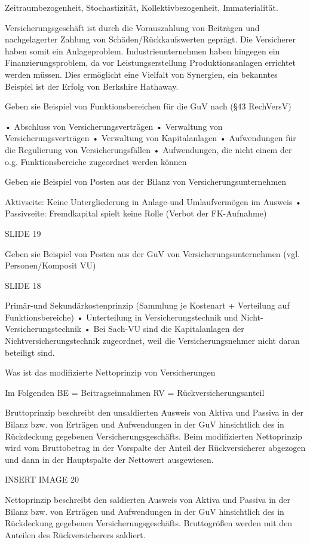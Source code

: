 Zeitraumbezogenheit, Stochastizität, Kollektivbezogenheit, Immaterialität.

Versicherungsgeschäft ist durch die Vorauszahlung von Beiträgen und nachgelagerter Zahlung von Schäden/Rückkaufswerten
geprägt. Die Versicherer haben somit ein Anlageproblem. Industrieunternehmen haben hingegen ein Finanzierungsproblem, da vor
Leistungserstellung Produktionsanlagen errichtet werden müssen. Dies ermöglicht eine Vielfalt von Synergien, ein bekanntes Beispiel
ist der Erfolg von Berkshire Hathaway.

Geben sie Beispiel von Funktionsbereichen für die GuV nach (§43 RechVersV)

• Abschluss von Versicherungsverträgen
• Verwaltung von Versicherungsverträgen
• Verwaltung von Kapitalanlagen
• Aufwendungen für die Regulierung von Versicherungsfällen
• Aufwendungen, die nicht einem der o.g. Funktionsbereiche zugeordnet werden können


Geben sie Beispiel von Posten aus der Bilanz von Versicherungsunternehmen

Aktivseite: Keine Untergliederung in Anlage-und Umlaufvermögen im Ausweis
• Passivseite: Fremdkapital spielt keine Rolle (Verbot der FK-Aufnahme)


SLIDE 19

Geben sie Beispiel von Posten aus der GuV von Versicherungsunternehmen (vgl. Personen/Komposit VU)

SLIDE 18

Primär-und Sekundärkostenprinzip (Sammlung je Kostenart + Verteilung auf Funktionsbereiche)
• Unterteilung in Versicherungstechnik und Nicht-Versicherungstechnik
• Bei Sach-VU sind die Kapitalanlagen der Nichtversicherungstechnik zugeordnet, weil die Versicherungsnehmer nicht daran beteiligt sind.


Was ist das modifizierte Nettoprinzip von Versicherungen

Im Folgenden
BE = Beitragseinnahmen
RV = Rückversicherungsanteil

Bruttoprinzip beschreibt den unsaldierten Ausweis von Aktiva und Passiva in der Bilanz bzw. von
Erträgen und Aufwendungen in der GuV hinsichtlich des in Rückdeckung gegebenen
Versicherungsgeschäfts. Beim modifizierten Nettoprinzip wird vom Bruttobetrag in der Vorspalte
der Anteil der Rückversicherer abgezogen und dann in der Hauptspalte der Nettowert ausgewiesen.


INSERT IMAGE 20


Nettoprinzip beschreibt den saldierten Ausweis von Aktiva und Passiva in der Bilanz bzw. von
Erträgen und Aufwendungen in der GuV hinsichtlich des in Rückdeckung gegebenen
Versicherungsgeschäfts. Bruttogrößen werden mit den Anteilen des Rückversicherers saldiert.


